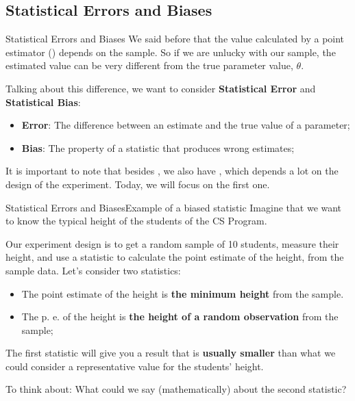 \subsection{Statistical Errors and Biases}
\begin{frame}{Statistical Errors and Biases}
  We said before that the value calculated by a point estimator () depends on the sample. So if we are unlucky with our sample, the estimated value can be very different from the true parameter value, $\theta$.\bigskip

  Talking about this difference, we want to consider {\bf Statistical Error} and {\bf Statistical Bias}:

  \begin{itemize}
    \item {\bf Error}: The difference between an estimate and the true value of a parameter;
    \item {\bf Bias}: The property of a statistic that  produces wrong estimates;
  \end{itemize}\vfill

  It is important to note that besides , we also have , which depends a lot on the design of the experiment. Today, we will focus on the first one.
\end{frame}


\begin{frame}{Statistical Errors and Biases}{Example of a biased statistic}
  Imagine that we want to know the typical height of the students of the CS Program.\bigskip

  Our experiment design is to get a random sample of 10 students, measure their height, and use a statistic to calculate the point estimate of the height, from the sample data. Let's consider two statistics:
  \begin{itemize}
    \item The point estimate of the height is {\bf the minimum height} from the sample.
    \item The p. e. of the height is {\bf the height of a random observation} from the sample;
  \end{itemize}\bigskip

  The first statistic will give you a result that is {\bf usually smaller} than what we could consider a representative value for the students' height.\bigskip

  \alert{To think about}: What could we say (mathematically) about the second statistic?
\end{frame}

